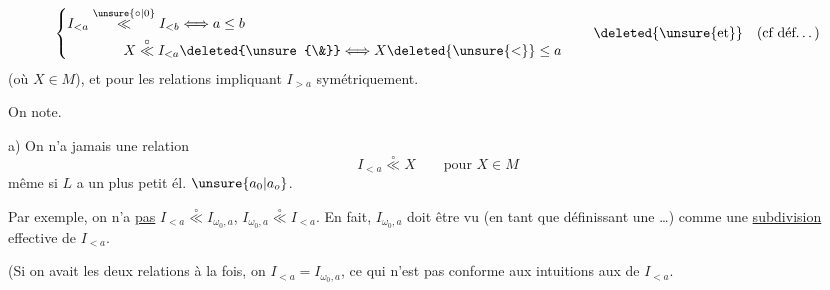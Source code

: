 \[
\left\{\begin{aligned}
I_{<a}\overset{\unsure{\circ|0}}{\ll}I_{<b}&\Longleftrightarrow a\leq b\\
X\overset{\circ}{\ll}I_{<a}&\deleted{\unsure{\&}}\Longleftrightarrow X\deleted{\unsure{<}}\leq a
\end{aligned}\right.
\qquad \deleted{\unsure{\text{et}}}\quad\text{(cf déf\ldots)}
\]
(où $X\in M$), et  pour  les relations  impliquant $I_{>a}$   symétriquement.

On note.

a) On n'a jamais une relation
\[
I_{<a}\overset{\circ}{\ll}X\qquad\text{pour }X\in M
\]
même si $L$ a un plus petit él. $\unsure{a_0|a_o}$.

Par exemple,  on n'a \uline{pas} $I_{<a}\overset{\circ}{\ll}I_{\omega_0,a}$,   $I_{\omega_0,a}\overset{\circ}{\ll}I_{<a}$. En fait, $I_{\omega_0,a}$ doit être vu (en tant que définissant une \ldots) comme une \uline{subdivision} effective de $I_{<a}$.

(Si on avait les deux relations à la fois, on  $I_{<a}=I_{\omega_0,a}$, ce qui n'est pas conforme aux intuitions  aux  de $I_{<a}$.

